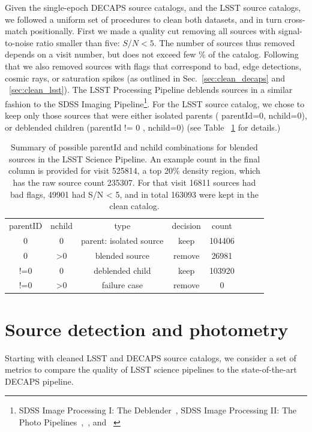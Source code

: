 \documentclass[DM,lsstdraft,toc,usenatbib]{lsstdoc}
\begin{document}
Given the single-epoch DECAPS source catalogs, and the LSST source catalogs, we followed a uniform set of procedures to clean both datasets, and in turn cross-match positionally. First we made a quality cut removing all sources with signal-to-noise ratio smaller than five:  $S/N < 5$. The number of sources thus removed depends on a visit number, but does not exceed few \% of the catalog. Following that we also removed sources with flags that correspond to bad, edge detections, cosmic rays, or saturation spikes (as outlined in Sec.~\ref{sec:clean_decaps} and ~\ref{sec:clean_lsst}). The LSST Processing Pipeline deblends sources in a similar fashion to the SDSS Imaging Pipeline\footnote{SDSS Image Processing I: The Deblender~\citep{lupton2005}, SDSS Image Processing II: The Photo Pipelines~\citep{lupton2001},~\citep{lupton2002}, and ~\citep{lupton2005a}}.   For the LSST source catalog,  we chose to keep only those sources that were either isolated parents ( parentId=0, nchild=0), or deblended children (parentId != 0 , nchild=0) (see Table ~\ref{tab:lsst_deblend} for details.)



\begin{table}
\centering
\caption{ Summary of possible parentId and nchild combinations for blended sources in the LSST Science Pipeline. An example count in the final column is provided for visit 525814, a top 20\% density region, which has the raw source count 235307. For that visit  16811 sources had bad flags, 49901  had S/N < 5, and in total 163093 were kept in the clean catalog.  }
\label{tab:lsst_deblend}
\begin{tabular}{cccccccc}
parentID & nchild & type  & decision &  count \\
0 & 0 & parent: isolated source & keep & 104406 \\
0 & >0 & blended source & remove & 26981 \\
!=0 & 0 & deblended child & keep  &103920\\
!=0 & >0 & failure case & remove & 0 \\
\hline
\end{tabular}
\end{table}


\section{Source detection and photometry}
\label{sec:metrics}

Starting with cleaned LSST and DECAPS source catalogs, we consider a set of metrics to compare the quality of LSST science pipelines to the  state-of-the-art DECAPS pipeline.  
\end{document}
